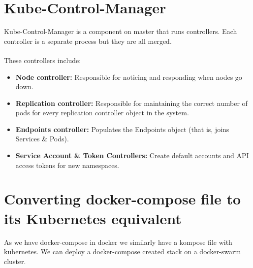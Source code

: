 \documentclass[12pt]{report}
\begin{document}
\section{Kube-Control-Manager}
Kube-Control-Manager is a component on master that runs controllers.
Each controller is a separate process but they are all merged.\\\\
These controllers include:
\begin{itemize}
	\item \textbf{Node controller:} Responsible for noticing and responding when nodes go down.
	\item \textbf{Replication controller:} Responsible for maintaining the correct number of pods for every replication controller object in the system.
	\item \textbf{Endpoints controller:} Populates the Endpoints object (that is, joins Services \& Pods).
	\item \textbf{Service Account \& Token Controllers:} Create default accounts and API access tokens for new namespaces.
\end{itemize}
\section{Converting docker-compose file to its Kubernetes equivalent}
As we have docker-compose in docker we similarly have a kompose file with kubernetes. We can deploy a docker-compose created stack on a docker-swarm cluster. 
\end{document}
